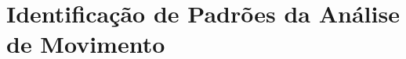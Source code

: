 \chapter{Identificação de Padrões da Análise de Movimento}\label{sec:analise_movimento_identificacao_padroes}





\section{}







